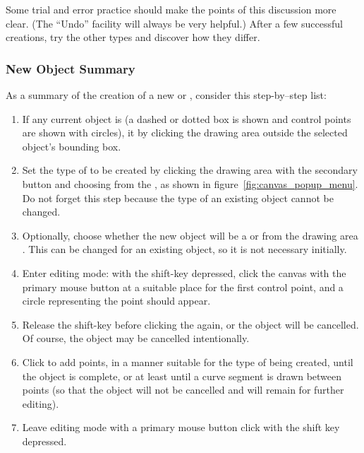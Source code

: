 			Some trial and error practice should make the
			points of this discussion more clear.
			(The ``Undo'' facility will always be very
			helpful.) After a few successful \IXbezn{}
			creations, try the other \IXspline{} types and discover
			how they differ.


			\subsubsection{New Object Summary}%
			\label{sssec:new_obj_summary}
			As a summary of the creation of a new \IXprism{}
			or \IXlathe{}, consider this step-by--step list:
			
			\begin{enumerate}
				\item If any current object is 
						(a dashed or dotted box is shown and
						control points are shown with circles),
						 it by clicking the
						drawing area outside the selected object's
						bounding box.
				\item Set the type of \IXspline{}
						to be created by clicking the
						drawing area with the secondary 
						button and choosing from the ,
						as shown in
						figure~\ref{fig:canvas_popup_menu}.
						Do not forget this step because the
						\IXspline{} type of an existing
						object cannot be changed.
				\item Optionally, choose whether the new object
						will be a \IXprism{} or \IXlathe{}
						from the drawing area .
						This can be changed for an existing
						object, so it is not necessary initially.
				\item Enter editing mode:
						with the shift-key depressed, click the
						canvas with
						the primary mouse button at a suitable
						place for the first control point, and
						a circle representing the point should appear.
				\item Release the shift-key before clicking
						the  again, or the object
						will be cancelled. Of course, the object
						may be cancelled intentionally.
				\item Click to add points, in a manner suitable
						for the type of \IXspline{} being created,
						until the object is complete, or at
						least until a curve segment is drawn between
						points (so that the object will not
						be cancelled and will remain for further
						editing).
				\item Leave editing mode with a primary
						mouse button click with the shift
						key depressed.
			\end{enumerate}


